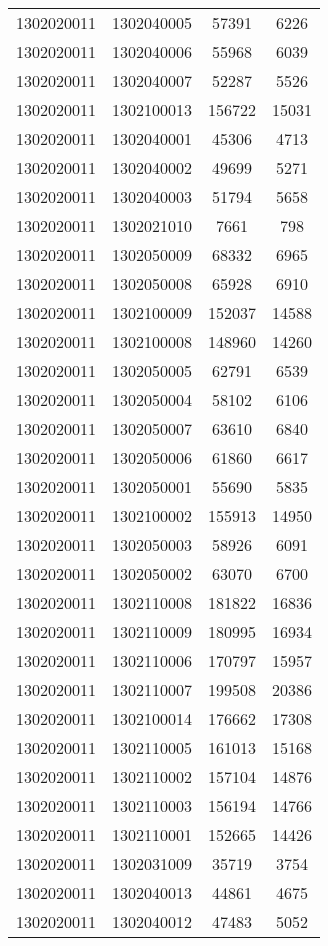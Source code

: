 \begin{longtable}[h]{llcc}
		1302020011 & 1302040005 & 57391 & 6226\\
		1302020011 & 1302040006 & 55968 & 6039\\
		1302020011 & 1302040007 & 52287 & 5526\\
		1302020011 & 1302100013 & 156722 & 15031\\
		1302020011 & 1302040001 & 45306 & 4713\\
		1302020011 & 1302040002 & 49699 & 5271\\
		1302020011 & 1302040003 & 51794 & 5658\\
		1302020011 & 1302021010 & 7661 & 798\\
		1302020011 & 1302050009 & 68332 & 6965\\
		1302020011 & 1302050008 & 65928 & 6910\\
		1302020011 & 1302100009 & 152037 & 14588\\
		1302020011 & 1302100008 & 148960 & 14260\\
		1302020011 & 1302050005 & 62791 & 6539\\
		1302020011 & 1302050004 & 58102 & 6106\\
		1302020011 & 1302050007 & 63610 & 6840\\
		1302020011 & 1302050006 & 61860 & 6617\\
		1302020011 & 1302050001 & 55690 & 5835\\
		1302020011 & 1302100002 & 155913 & 14950\\
		1302020011 & 1302050003 & 58926 & 6091\\
		1302020011 & 1302050002 & 63070 & 6700\\
		1302020011 & 1302110008 & 181822 & 16836\\
		1302020011 & 1302110009 & 180995 & 16934\\
		1302020011 & 1302110006 & 170797 & 15957\\
		1302020011 & 1302110007 & 199508 & 20386\\
		1302020011 & 1302100014 & 176662 & 17308\\
		1302020011 & 1302110005 & 161013 & 15168\\
		1302020011 & 1302110002 & 157104 & 14876\\
		1302020011 & 1302110003 & 156194 & 14766\\
		1302020011 & 1302110001 & 152665 & 14426\\
		1302020011 & 1302031009 & 35719 & 3754\\
		1302020011 & 1302040013 & 44861 & 4675\\
		1302020011 & 1302040012 & 47483 & 5052\\

\end{longtable}
